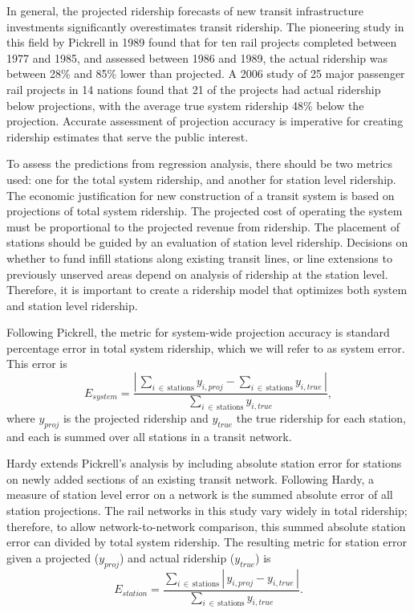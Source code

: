 \documentclass[11pt]{report}
\begin{document}
In general, the projected ridership forecasts of new transit infrastructure investments significantly overestimates transit ridership. The pioneering study in this field by Pickrell in 1989 \cite{Pickrell1989} found that for ten rail projects completed between 1977 and 1985, and assessed between 1986 and 1989, the actual ridership was between 28\% and 85\% lower than projected. A 2006 study \cite{Flyvbjerg2006} of 25 major passenger rail projects in 14 nations found that 21 of the projects had actual ridership below projections, with the average true system ridership 48\% below the projection. Accurate assessment of projection accuracy is imperative for creating ridership estimates that serve the public interest.

To assess the predictions from regression analysis, there should be two metrics used: one for the total system ridership, and another for station level ridership. The economic justification for new construction of a transit system is based on projections of total system ridership. The projected cost of operating the system must be proportional to the projected revenue from ridership. The placement of stations should be guided by an evaluation of station level ridership. Decisions on whether to fund infill stations along existing transit lines, or line extensions to previously unserved areas depend on analysis of ridership at the station level. Therefore, it is important to create a ridership model that optimizes both system and station level ridership. 

Following Pickrell, the metric for system-wide projection accuracy is standard percentage error in total system ridership, which we will refer to as system error. This error is
$$E_{system} = \dfrac{\left|\,\sum\limits_{i\,\in\,\text{stations}} y_{i, proj} - \sum\limits_{i\,\in\,\text{stations}} y_{i, true}\,\right|}{\sum\limits_{i\,\in\,\text{stations}} y_{i, true}},$$
where $y_{proj}$ is the projected ridership and $y_{true}$ the true ridership for each station, and each is summed over all stations in a transit network.

Hardy \cite{Hardy2010} extends Pickrell's analysis by including absolute station error for stations on newly added sections of an existing transit network. Following Hardy, a measure of station level error on a network is the summed absolute error of all station projections. The rail networks in this study vary widely in total ridership; therefore, to allow network-to-network comparison, this summed absolute station error can divided by total system ridership. The resulting metric for station error given a projected ($y_{proj}$) and actual ridership ($y_{true}$) is 
$$E_{station} = \dfrac{\sum\limits_{i\,\in\,\text{stations}}\left|\,y_{i, proj} - y_{i, true}\,\right|}{\sum\limits_{i\,\in\,\text{stations}} y_{i, true}}.$$
\end{document}
